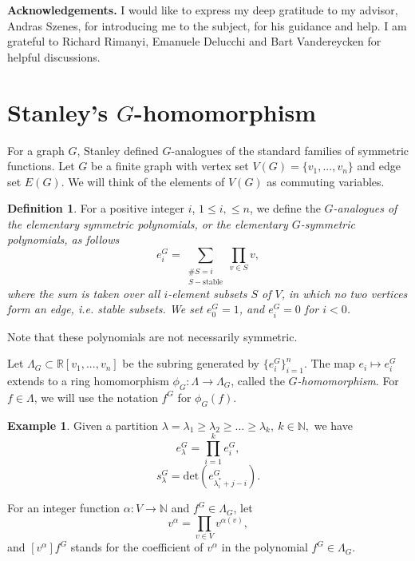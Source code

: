 \documentclass{article}
\theoremstyle{plain}
\theoremstyle{definition}
\newtheorem{defn}[thm]{Definition}
\newtheorem{exmp}[thm]{Example}
\begin{document}
\bigskip

\textbf {Acknowledgements.}  I would like to express my deep gratitude
to my advisor, Andras Szenes, for introducing me to the subject, for
his guidance and help. I am grateful to Richard Rimanyi, Emanuele Delucchi and Bart Vandereycken for helpful discussions.


\section{Stanley's $G$-homomorphism}\label{Ghom}
For a graph $G$, Stanley \cite[p.~6]{Stanley95b} defined $G$-analogues of the standard families of symmetric functions. Let $G$ be a finite graph with vertex set $V(G)=\{v_1,...,v_n\}$ and edge set $E(G)$. We will think of the elements of $V(G)$ as commuting variables. 


\begin{defn} \label{eG}
For a positive integer $i$, $1\leq i, \leq n$, we define the \em $G$-analogues \normalfont of the elementary symmetric polynomials, or \em the elementary $G$-symmetric polynomials\normalfont, as follows
 $$e_i^G =\sum\limits_{\substack{\#S=i\\
     S-\mathrm{stable}}}\prod\limits_{v\in S}v,$$ where the sum is
 taken over all $i$-element subsets $S$ of $V$, in which no two
 vertices form an edge, i.e. stable subsets. We set $e_0^G=1$, and $e_i^G=0$ for $i<0$.
\end{defn}
Note that these polynomials are not necessarily symmetric.

Let $\Lambda_G\subset\mathbb{R}[v_1,...,v_n]$ be the subring generated
by $\{e_i^G\}_{i=1}^{n}$.  The map $e_i\mapsto e_i^G$ extends to a
ring homomorphism $\phi_G: \Lambda\rightarrow\Lambda_G$, called the
{\em $G$-homomorphism}. For $f\in \Lambda$, we will use the notation $f^G$ for $\phi_G(f)$.

\begin{exmp}
Given a partition $\lambda = \lambda_1\geq \lambda_2\geq...\geq\lambda_k,\ k\in \mathbb{N},$ we have $$e_{\lambda}^G = \prod\limits_{i=1}^k e_i^G,$$
$$s_{\lambda}^G=\mathrm{det}(e_{\lambda_i^*+j-i}^G).$$
\end{exmp}



For an integer function $\alpha: V\rightarrow \mathbb{N}$ and $f^G\in\Lambda_G$, let
$$v^\alpha = \prod\limits_{v\in V}v^{\alpha(v)},$$ 
 and $[v^\alpha]f^G$ stands for the coefficient of $v^\alpha$ in the polynomial $f^G\in\Lambda_G$. 
\end{document}

